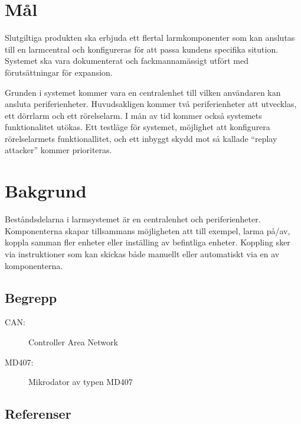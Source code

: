 \documentclass[a4paper]{article}
\begin{document}
\section{Mål}


Slutgiltiga produkten ska erbjuda ett flertal larmkomponenter som kan anslutas till en larmcentral och konfigureras för att passa kundens specifika sitution. Systemet ska vara dokumenterat och fackmannamässigt utfört med förutsättningar för expansion.

Grunden i systemet kommer vara en centralenhet till vilken användaren kan ansluta periferienheter. Huvudsakligen kommer två periferienheter att utvecklas, ett dörrlarm och ett rörelselarm. I mån av tid kommer också systemets funktionalitet utökas. Ett testläge för systemet, möjlighet att konfigurera rörelselarmets funktionallitet, och ett inbyggt skydd mot så kallade ``replay attacker'' kommer prioriteras.


\section{Bakgrund}

Beståndsdelarna i larmsystemet är en centralenhet och periferienheter. Komponenterna skapar tillsammans möjligheten att till exempel, larma på/av, koppla samman fler enheter eller inställing av befintliga enheter. Koppling sker via instruktioner som kan skickas både manuellt eller automatiskt via en av komponenterna.

\subsection{Begrepp}

\begin{description}
    \item[CAN:] Controller Area Network
    \item[MD407:] Mikrodator av typen MD407
\end{description}

\subsection{Referenser}
\end{document}
